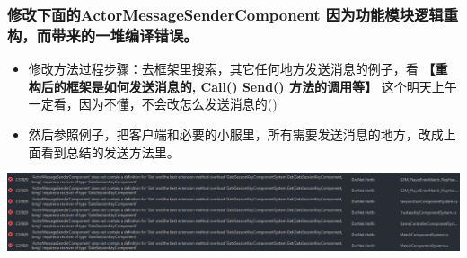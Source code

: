 \documentclass[9pt, b5paper]{article}
\begin{document}
\subsubsection{修改下面的ActorMessageSenderComponent 因为功能模块逻辑重构，而带来的一堆编译错误。}
\label{sec:org0b76a28}
\begin{itemize}
\item 修改方法过程步骤：去框架里搜索，其它任何地方发送消息的例子，看 \textbf{【重构后的框架是如何发送消息的, Call() Send() 方法的调用等】} 这个明天上午一定看，因为不懂，不会改怎么发送消息的()
\item 然后参照例子，把客户端和必要的小服里，所有需要发送消息的地方，改成上面看到总结的发送方法里。
\end{itemize}

\begin{center}
\includegraphics[width=.9\linewidth]{./pic/et4_20230616_160327.png}
\end{center}
\end{document}
